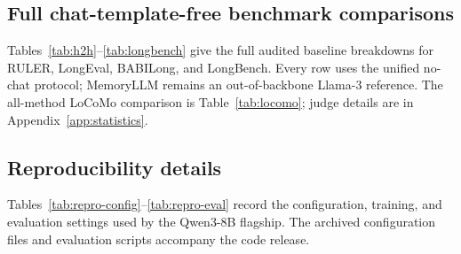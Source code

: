 

\FloatBarrier
\subsection{Full chat-template-free benchmark comparisons}
\label{app:tasks}
Tables~\ref{tab:h2h}--\ref{tab:longbench} give the full audited baseline
breakdowns for RULER, LongEval, BABILong, and LongBench. Every row uses the
unified no-chat protocol; MemoryLLM remains an out-of-backbone Llama-3 reference.
The all-method LoCoMo comparison is Table~\ref{tab:locomo}; judge details are in
Appendix~\ref{app:statistics}.






\FloatBarrier
\subsection{Reproducibility details}
\label{app:reproducibility}
Tables~\ref{tab:repro-config}--\ref{tab:repro-eval} record the configuration,
training, and evaluation settings used by the Qwen3-8B flagship. The archived
configuration files and evaluation scripts accompany the code release.

